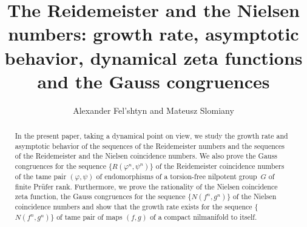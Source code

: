 \documentclass[12pt, a4paper]{amsart}
\begin{document}
\title[The Reidemeister and the Nielsen numbers]
{The Reidemeister and the Nielsen numbers: growth rate, asymptotic behavior, dynamical zeta functions  and  the Gauss congruences }

\author{Alexander Fel'shtyn and Mateusz Slomiany}

\address{Alexander Fel'shtyn, Instytut Matematyki, Uniwersytet Szczecinski,
ul. Wielkopolska 15, 70-451 Szczecin, Poland}

\address{Mateusz Slomiany, Instytut Matematyki, Uniwersytet Szczecinski,
ul. Wielkopolska 15, 70-451 Szczecin, Poland}


\begin{abstract}
In the present paper, taking a dynamical point on view,  we    study the growth rate and   asymptotic behavior of the sequences  of  the Reidemeister numbers and the sequences  of  the Reidemeister and the Nielsen coincidence numbers. We also prove the Gauss congruences for  the sequence   $\{R(\varphi^n,\psi^n)\}$ of  the
Reidemeister coincidence numbers of the tame pair $(\varphi,\psi)$ of endomorphisms of a
torsion-free nilpotent group~$G$ of finite Pr\"ufer rank.
Furthermore, we prove the rationality of the Nielsen coincidence zeta function,
the Gauss congruences for  the sequence $\{N(f^n, g^n)\}$ of the Nielsen coincidence numbers
and show that the growth rate exists for the sequence  \{$N(f^n, g^n)\}$
of  tame pair of maps $(f,g)$ of a compact nilmanifold to itself.
\end{abstract}

\maketitle
\setcounter{tocdepth}{1}
\tableofcontents
\end{document}
